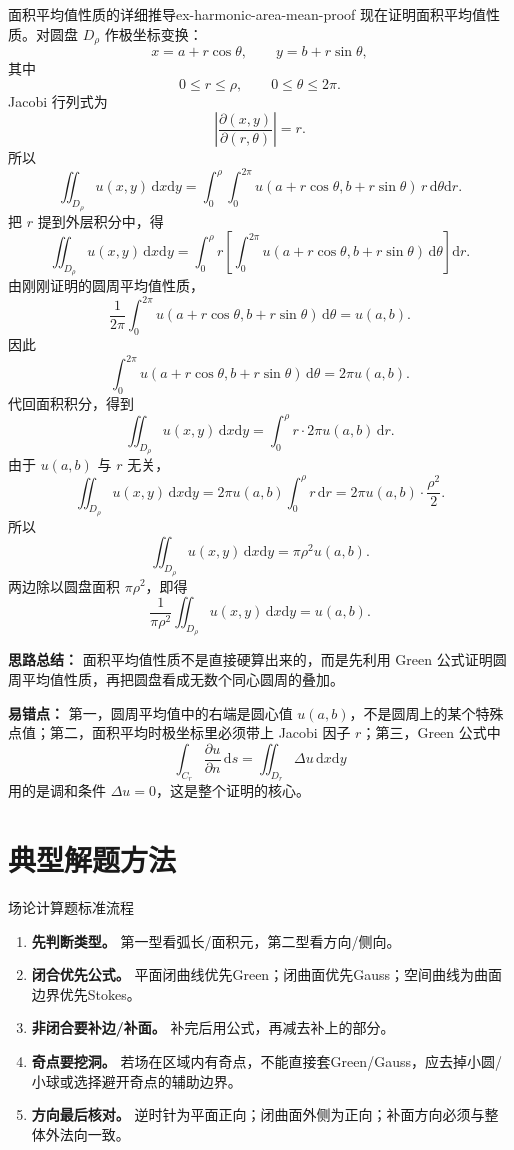 \documentclass[UTF8,zihao=-4,openany]{ctexbook}
\begin{document}
\begin{example}{面积平均值性质的详细推导}{ex-harmonic-area-mean-proof}
现在证明面积平均值性质。对圆盘 $D_\rho$ 作极坐标变换：
\[
  x=a+r\cos\theta,\qquad y=b+r\sin\theta,
\]
其中
\[
  0\leq r\leq \rho,\qquad 0\leq \theta\leq 2\pi.
\]
Jacobi 行列式为
\[
  \left|\frac{\partial(x,y)}{\partial(r,\theta)}\right|=r.
\]
所以
\[
  \iint_{D_\rho}u(x,y)\,\mathrm{d}x\mathrm{d}y
  =
  \int_0^\rho\int_0^{2\pi}
  u(a+r\cos\theta,b+r\sin\theta)\,r\,\mathrm{d}\theta\mathrm{d}r.
\]
把 $r$ 提到外层积分中，得
\[
  \iint_{D_\rho}u(x,y)\,\mathrm{d}x\mathrm{d}y
  =
  \int_0^\rho
  r\left[
  \int_0^{2\pi}
  u(a+r\cos\theta,b+r\sin\theta)\,\mathrm{d}\theta
  \right]\mathrm{d}r.
\]
由刚刚证明的圆周平均值性质，
\[
  \frac{1}{2\pi}
  \int_0^{2\pi}
  u(a+r\cos\theta,b+r\sin\theta)\,\mathrm{d}\theta
  =
  u(a,b).
\]
因此
\[
  \int_0^{2\pi}
  u(a+r\cos\theta,b+r\sin\theta)\,\mathrm{d}\theta
  =
  2\pi u(a,b).
\]
代回面积积分，得到
\[
  \iint_{D_\rho}u(x,y)\,\mathrm{d}x\mathrm{d}y
  =
  \int_0^\rho r\cdot 2\pi u(a,b)\,\mathrm{d}r.
\]
由于 $u(a,b)$ 与 $r$ 无关，
\[
  \iint_{D_\rho}u(x,y)\,\mathrm{d}x\mathrm{d}y
  =
  2\pi u(a,b)\int_0^\rho r\,\mathrm{d}r
  =
  2\pi u(a,b)\cdot \frac{\rho^2}{2}.
\]
所以
\[
  \iint_{D_\rho}u(x,y)\,\mathrm{d}x\mathrm{d}y
  =
  \pi\rho^2u(a,b).
\]
两边除以圆盘面积 $\pi\rho^2$，即得
\[
  \frac{1}{\pi\rho^2}
  \iint_{D_\rho}u(x,y)\,\mathrm{d}x\mathrm{d}y
  =
  u(a,b).
\]

\textbf{思路总结：}
面积平均值性质不是直接硬算出来的，而是先利用 Green 公式证明圆周平均值性质，再把圆盘看成无数个同心圆周的叠加。

\textbf{易错点：}
第一，圆周平均值中的右端是圆心值 $u(a,b)$，不是圆周上的某个特殊点值；第二，面积平均时极坐标里必须带上 Jacobi 因子 $r$；第三，Green 公式中
\[
  \int_{C_r}\frac{\partial u}{\partial n}\,\mathrm{d}s
  =
  \iint_{D_r}\Delta u\,\mathrm{d}x\mathrm{d}y
\]
用的是调和条件 $\Delta u=0$，这是整个证明的核心。
\end{example}

\section{典型解题方法}
\begin{methodbox}{场论计算题标准流程}
\begin{enumerate}
\item \textbf{先判断类型。} 第一型看弧长/面积元，第二型看方向/侧向。
\item \textbf{闭合优先公式。} 平面闭曲线优先Green；闭曲面优先Gauss；空间曲线为曲面边界优先Stokes。
\item \textbf{非闭合要补边/补面。} 补完后用公式，再减去补上的部分。
\item \textbf{奇点要挖洞。} 若场在区域内有奇点，不能直接套Green/Gauss，应去掉小圆/小球或选择避开奇点的辅助边界。
\item \textbf{方向最后核对。} 逆时针为平面正向；闭曲面外侧为正向；补面方向必须与整体外法向一致。
\end{enumerate}
\end{methodbox}
\end{document}
